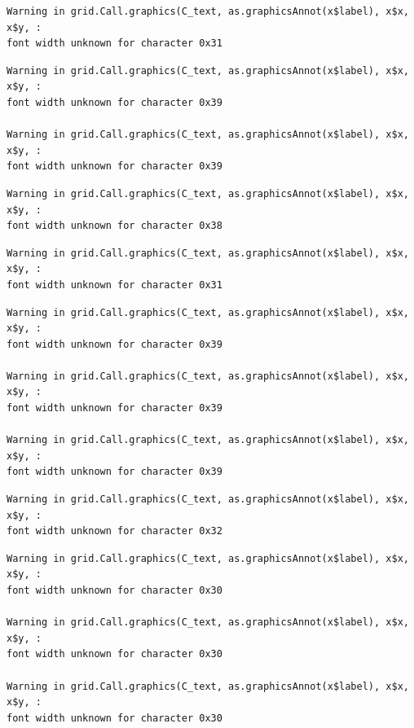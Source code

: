 \documentclass[
  letterpaper,
  DIV=11,
  numbers=noendperiod]{scrreprt}
\begin{document}
\begin{verbatim}
Warning in grid.Call.graphics(C_text, as.graphicsAnnot(x$label), x$x, x$y, :
font width unknown for character 0x31
\end{verbatim}

\begin{verbatim}
Warning in grid.Call.graphics(C_text, as.graphicsAnnot(x$label), x$x, x$y, :
font width unknown for character 0x39

Warning in grid.Call.graphics(C_text, as.graphicsAnnot(x$label), x$x, x$y, :
font width unknown for character 0x39
\end{verbatim}

\begin{verbatim}
Warning in grid.Call.graphics(C_text, as.graphicsAnnot(x$label), x$x, x$y, :
font width unknown for character 0x38
\end{verbatim}

\begin{verbatim}
Warning in grid.Call.graphics(C_text, as.graphicsAnnot(x$label), x$x, x$y, :
font width unknown for character 0x31
\end{verbatim}

\begin{verbatim}
Warning in grid.Call.graphics(C_text, as.graphicsAnnot(x$label), x$x, x$y, :
font width unknown for character 0x39

Warning in grid.Call.graphics(C_text, as.graphicsAnnot(x$label), x$x, x$y, :
font width unknown for character 0x39

Warning in grid.Call.graphics(C_text, as.graphicsAnnot(x$label), x$x, x$y, :
font width unknown for character 0x39
\end{verbatim}

\begin{verbatim}
Warning in grid.Call.graphics(C_text, as.graphicsAnnot(x$label), x$x, x$y, :
font width unknown for character 0x32
\end{verbatim}

\begin{verbatim}
Warning in grid.Call.graphics(C_text, as.graphicsAnnot(x$label), x$x, x$y, :
font width unknown for character 0x30

Warning in grid.Call.graphics(C_text, as.graphicsAnnot(x$label), x$x, x$y, :
font width unknown for character 0x30

Warning in grid.Call.graphics(C_text, as.graphicsAnnot(x$label), x$x, x$y, :
font width unknown for character 0x30
\end{verbatim}
\end{document}
